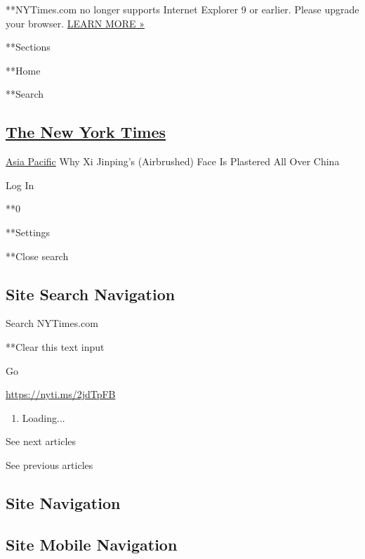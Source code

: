  **NYTimes.com no longer supports Internet Explorer 9 or earlier. Please
upgrade your browser.
\href{http://www.nytimes3xbfgragh.onion/content/help/site/ie9-support.html}{LEARN
MORE »}

**Sections

**Home

**Search

\hypertarget{the-new-york-times}{%
\subsection{\texorpdfstring{\href{http://www.nytimes3xbfgragh.onion/}{The
New York Times}}{The New York Times}}\label{the-new-york-times}}

 \href{/section/world/asia}{Asia Pacific} \textbar{}Why Xi Jinping's
(Airbrushed) Face Is Plastered All Over China

Log In

**0

**Settings

**Close search

\hypertarget{site-search-navigation}{%
\subsection{Site Search Navigation}\label{site-search-navigation}}

Search NYTimes.com

**Clear this text input

Go

\url{https://nyti.ms/2jdTpFB}

\begin{enumerate}
\def\labelenumi{\arabic{enumi}.}
\item
  Loading...
\end{enumerate}

See next articles

See previous articles

\hypertarget{site-navigation}{%
\subsection{Site Navigation}\label{site-navigation}}

\hypertarget{site-mobile-navigation}{%
\subsection{Site Mobile Navigation}\label{site-mobile-navigation}}

